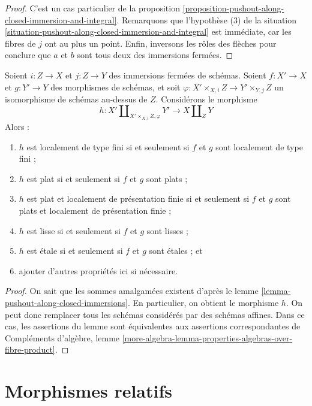 \begin{proof}
C'est un cas particulier de la
proposition \ref{proposition-pushout-along-closed-immersion-and-integral}.
Remarquons que l'hypothèse (3) de la
situation \ref{situation-pushout-along-closed-immersion-and-integral}
est immédiate, car
les fibres de $j$ ont au plus un point. Enfin, inversons les rôles des flèches
pour conclure que $a$ et $b$ sont tous deux des immersions fermées.
\end{proof}

\begin{lemma}
\label{lemma-pushout-along-closed-immersions-properties-above}
Soient $i : Z \to X$ et $j : Z \to Y$ des immersions fermées de schémas.
Soient $f : X' \to X$ et $g : Y' \to Y$ des morphismes de schémas, et soit
$\varphi : X' \times_{X, i} Z \to Y' \times_{Y, j} Z$
un isomorphisme de schémas au-dessus de $Z$. Considérons le morphisme
$$
h :
X' \amalg_{X' \times_{X, i} Z, \varphi} Y'
\longrightarrow
X \amalg_Z Y
$$
Alors :
\begin{enumerate}
\item $h$ est localement de type fini si et seulement si $f$ et $g$ sont
localement de type fini ;
\item $h$ est plat si et seulement si $f$ et $g$ sont plats ;
\item $h$ est plat et localement de présentation finie si et seulement si
$f$ et $g$ sont plats et localement de présentation finie ;
\item $h$ est lisse si et seulement si $f$ et $g$ sont lisses ;
\item $h$ est \'etale si et seulement si $f$ et $g$ sont \'etales ; et
\item ajouter d'autres propriétés ici si nécessaire.
\end{enumerate}
\end{lemma}

\begin{proof}
On sait que les sommes amalgamées existent d'après le
lemme \ref{lemma-pushout-along-closed-immersions}.
En particulier, on obtient le morphisme $h$.
On peut donc remplacer tous les schémas considérés par des
schémas affines. Dans ce cas, les assertions du lemme
sont équivalentes aux assertions correspondantes de
Compléments d'algèbre, lemme
\ref{more-algebra-lemma-properties-algebras-over-fibre-product}.
\end{proof}





\section{Morphismes relatifs}
\label{section-relative-morphisms}

